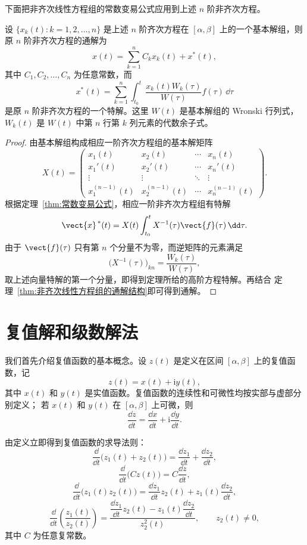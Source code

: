 下面把非齐次线性方程组的常数变易公式应用到上述 $n$ 阶非齐次方程。

\begin{theorem}\label{thm:高阶非齐次线性方程的常数变易公式}
	设 $\{x_k(t):k=1,2,\ldots,n\}$ 是上述 $n$ 阶齐次方程在
	$[\alpha,\beta]$ 上的一个基本解组，则原 $n$ 阶非齐次方程的通解为
	\[
		x(t)=\sum_{k=1}^{n}C_kx_k(t)+x^{*}(t),
	\]
	其中 $C_1,C_2,\ldots,C_n$ 为任意常数，而
	\[
		x^{*}(t)
		=\sum_{k=1}^{n}\int_{t_0}^{t}
		\dfrac{x_k(t)W_k(\tau)}{W(\tau)}f(\tau)\,\dd\tau
	\]
	是原 $n$ 阶非齐次方程的一个特解。这里 $W(t)$ 是基本解组的
	Wronski 行列式，$W_k(t)$ 是 $W(t)$ 中第 $n$ 行第 $k$ 列元素的代数余子式。
\end{theorem}

\begin{proof}
	由基本解组构成相应一阶齐次方程组的基本解矩阵
	\[
		X(t)=
		\begin{pmatrix}
			x_1(t) & x_2(t) & \cdots & x_n(t)\\
			x_1'(t) & x_2'(t) & \cdots & x_n'(t)\\
			\vdots & \vdots & \ddots & \vdots\\
			x_1^{(n-1)}(t) & x_2^{(n-1)}(t) & \cdots & x_n^{(n-1)}(t)
		\end{pmatrix}.
	\]
	根据定理~\ref{thm:常数变易公式}，相应一阶非齐次方程组有特解
	\[
		\vect{x}^{\,*}(t)
		=X(t)\int_{t_0}^{t}X^{-1}(\tau)\vect{f}(\tau)\,\dd\tau.
	\]
	由于 $\vect{f}(\tau)$ 只有第 $n$ 个分量不为零，而逆矩阵的元素满足
	\[
		\bigl(X^{-1}(\tau)\bigr)_{kn}
		=\dfrac{W_k(\tau)}{W(\tau)},
	\]
	取上述向量特解的第一个分量，即得到定理所给的高阶方程特解。再结合
	定理~\ref{thm:非齐次线性方程组的通解结构}即可得到通解。
\end{proof}


\section{复值解和级数解法}\label{sec:复值解和级数解法}

我们首先介绍复值函数的基本概念。设 $z(t)$ 是定义在区间
$[\alpha,\beta]$ 上的复值函数，记
\[
	z(t)=x(t)+\mathrm{i}y(t),
\]
其中 $x(t)$ 和 $y(t)$ 是实值函数。复值函数的连续性和可微性均按实部与虚部分别定义；
若 $x(t)$ 和 $y(t)$ 在 $[\alpha,\beta]$ 上可微，则
\[
	\dfrac{\dd z}{\dd t}
	=\dfrac{\dd x}{\dd t}
	+\mathrm{i}\dfrac{\dd y}{\dd t}.
\]

由定义立即得到复值函数的求导法则：
\[
	\dfrac{\dd}{\dd t}\bigl(z_1(t)+z_2(t)\bigr)
	=\dfrac{\dd z_1}{\dd t}+\dfrac{\dd z_2}{\dd t},
\]
\[
	\dfrac{\dd}{\dd t}\bigl(Cz(t)\bigr)
	=C\dfrac{\dd z}{\dd t},
\]
\[
	\dfrac{\dd}{\dd t}\bigl(z_1(t)z_2(t)\bigr)
	=\dfrac{\dd z_1}{\dd t}z_2(t)
	+z_1(t)\dfrac{\dd z_2}{\dd t},
\]
\[
	\dfrac{\dd}{\dd t}\left(\dfrac{z_1(t)}{z_2(t)}\right)
	=\dfrac{\dfrac{\dd z_1}{\dd t}z_2(t)
	-z_1(t)\dfrac{\dd z_2}{\dd t}}{z_2^2(t)},
	\qquad z_2(t)\neq 0,
\]
其中 $C$ 为任意复常数。

